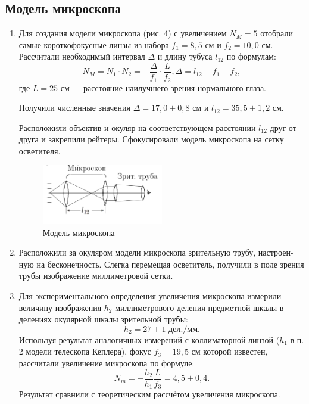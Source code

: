 \documentclass[a4paper, 12pt]{article}%
\begin{document}
	\subsection{Модель микроскопа}
	\begin{enumerate}
		\item Для создания модели микроскопа (рис. 4) с увеличением $N_M = 5$ отобрали
		самые короткофокусные линзы из набора $f_1 = 8{,}5$ см и $f_2=10{,}0$ см. Рассчитали необходимый интервал $\Delta$ и длину тубуса $l_{12}$ по формулам:
		\begin{equation*}
		N_M = N_1\cdot N_2 = -\dfrac{\Delta}{f_1}\cdot\dfrac{L}{f_2},
		\Delta=l_{12}-f_1-f_2,
		\end{equation*}
		где $L = 25$ см --- расстояние наилучшего зрения нормального глаза.
		
		Получили численные значения $\Delta = 17{,}0\pm0{,}8$ см и $l_{12} = 35{,}5\pm1{,}2$ см.
		
		Расположили объектив и окуляр на соответствующем расстоянии $l_{12}$ друг от друга и закрепили рейтеры. Сфокусировали модель микроскопа на сетку осветителя. 
		
		\begin{figure}
			\begin{center}
				\includegraphics[width = 0.5\textwidth]{pic/412-4.png}
				\caption{Модель микроскопа}
			\end{center}
		\end{figure}
		\item Расположили за окуляром модели микроскопа зрительную трубу, настроен-
		ную на бесконечность. Слегка перемещая осветитель, получили в поле зрения
		трубы изображение миллиметровой сетки. 
		
		\item Для экспериментального определения увеличения микроскопа измерили величину изображения $h_2$ миллиметрового деления предметной шкалы в делениях окулярной шкалы зрительной трубы:
		\begin{equation*}
		h_2 = 27\pm1\text{ дел./мм}.
		\end{equation*}
		Используя результат аналогичных измерений с коллиматорной линзой ($h_1$ в п. 2 модели телескопа Кеплера), фокус $f_3 = 19{,}5$ см которой известен, рассчитали увеличение микроскопа по формуле:
		\begin{equation*}
		N_m = -\dfrac{h_2}{h_1}\dfrac{L}{f_3} = 4{,}5\pm0{,}4.
		\end{equation*}
		Результат сравнили с теоретическим рассчётом увеличения микроскопа.
	\end{enumerate}
\end{document}
